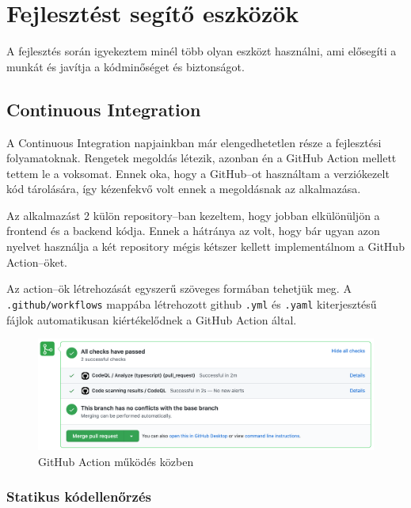 \chapter{Fejlesztést segítő eszközök}
A fejlesztés során igyekeztem minél több olyan eszközt használni, ami elősegíti a munkát és javítja a kódminőséget és biztonságot.

\section{Continuous Integration}
A Continuous Integration napjainkban már elengedhetetlen része a fejlesztési folyamatoknak.
Rengetek megoldás létezik, azonban én a GitHub Action mellett tettem le a voksomat.
Ennek oka, hogy a GitHub–ot használtam a verziókezelt kód tárolására, így kézenfekvő volt ennek a megoldásnak az alkalmazása.

Az alkalmazást 2 külön repository–ban kezeltem, hogy jobban elkülönüljön a frontend és a backend kódja.
Ennek a hátránya az volt, hogy bár ugyan azon nyelvet használja a két repository mégis kétszer kellett implementálnom a GitHub Action–öket.

Az action–ök létrehozását egyszerű szöveges formában tehetjük meg. 
A \lstinline|.github/workflows| mappába létrehozott github \lstinline|.yml| és \lstinline|.yaml| kiterjesztésű fájlok automatikusan kiértékelődnek a GitHub Action által.

\begin{figure}[!ht]
  \centering
  \includegraphics[width=150mm, keepaspectratio]{figures/ci.png}
  \caption{GitHub Action működés közben}
  \label{fig:GitHubAction}
\end{figure}

\subsection{Statikus kódellenőrzés}

